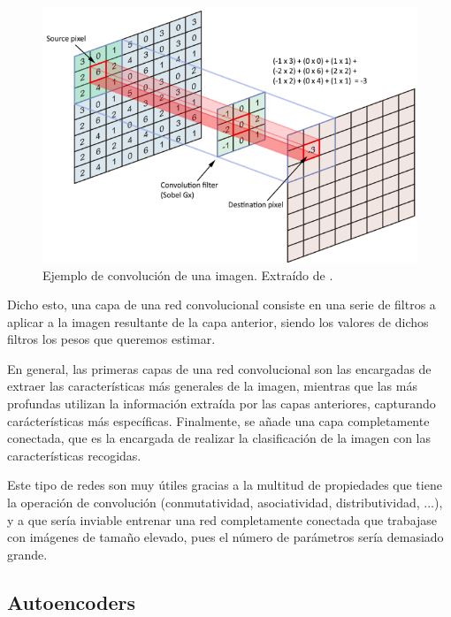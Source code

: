 \documentclass[
  a4paper,
  12pt,
  spanish,
]{scrartcl}
\theoremstyle{teorema-style}
\begin{document}
\begin{figure}[h]
    \centering
    \includegraphics[width=0.7\linewidth]{img/conv.png}
    \caption{Ejemplo de convolución de una imagen. Extraído de \parencite{arden_cnn_2017}.}%
    \label{fig:conv}
\end{figure}

Dicho esto, una capa de una red convolucional consiste en una serie de filtros a aplicar a la imagen resultante de la capa anterior, siendo los valores de dichos filtros los pesos que queremos estimar.

En general, las primeras capas de una red convolucional son las encargadas de extraer las características más generales de la imagen, mientras que las más profundas utilizan la información extraída por las capas anteriores, capturando carácterísticas más específicas. Finalmente, se añade una capa completamente conectada, que es la encargada de realizar la clasificación de la imagen con las características recogidas.

Este tipo de redes son muy útiles gracias a la multitud de propiedades que tiene la operación de convolución (conmutatividad, asociatividad, distributividad, ...), y a que sería inviable entrenar una red completamente conectada que trabajase con imágenes de tamaño elevado, pues el número de parámetros sería demasiado grande.

\subsection{Autoencoders}
\end{document}
